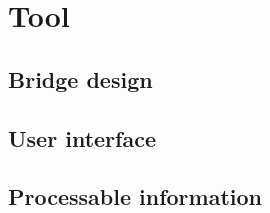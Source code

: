 \section{Tool}

\subsection{Bridge design}

\subsection{User interface}

\subsection{Processable information}